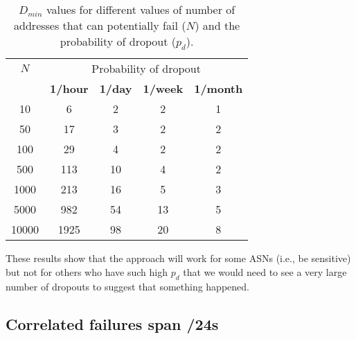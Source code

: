 \begin{table}[th]
  \centering
  \hspace{-0.04in}
  \begin{tabular}{c|c|c|c|c|}
$N$ & \multicolumn{4}{c|}{Probability of dropout} \\
    & \textbf{1/hour} & \textbf{1/day} & \textbf{1/week} &
    \textbf{1/month} \\
    \hline
10 & 6 & 2 & 2 & 1\\
50 & 17 & 3 & 2 & 2\\
100 & 29 & 4 & 2 & 2\\
500 & 113 & 10 & 4 & 2\\
1000 & 213 & 16 & 5 & 3\\
5000 & 982 & 54 & 13 & 5\\
10000 & 1925 & 98 & 20 & 8\\
    \end{tabular}
  \caption{\label{tbl:binomial_thresh} $D_{min}$ values
    for different
    values of number of addresses that can potentially fail ($N$) and
    the probability of dropout ($p_d$). }
\end{table}

These results show that the approach will work for some ASNs (i.e., be
sensitive) but not for others who have such high $p_d$ that we would need to see a very large number of dropouts to suggest that something happened.









\subsection{Correlated failures span /24s}

